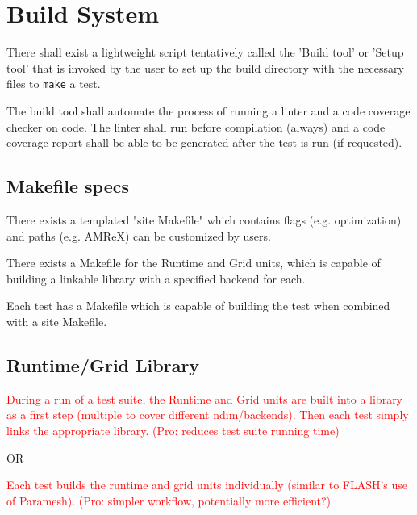 \documentclass{article}
\begin{document}
\section{Build System}
\begin{req}
There shall exist a lightweight script tentatively called the 'Build tool' or 'Setup tool' that is invoked by the user to set up the build directory with the necessary files to \texttt{make} a test.
\end{req}
\begin{req}
The build tool shall automate the process of running a linter and a code coverage checker on code. The linter shall run before compilation (always) and a code coverage report shall be able to be generated after the test is run (if requested).
\end{req}

\subsection{Makefile specs}
\begin{spec}
There exists a templated "site Makefile" which contains flags (e.g. optimization) and paths (e.g. AMReX) can be customized by users.
\end{spec}
\begin{spec}
There exists a Makefile for the Runtime and Grid units, which is capable of building a linkable library with a specified backend for each.
\end{spec}
\begin{spec}
Each test has a Makefile which is capable of building the test when combined with a site Makefile.
\end{spec}


\subsection{Runtime/Grid Library}
\begin{spec}
\textcolor{red}{
During a run of a test suite, the Runtime and Grid units are built into a library as a first step (multiple to cover different ndim/backends). Then each test simply links the appropriate library. (Pro: reduces test suite running time)}

OR

\textcolor{red}{Each test builds the runtime and grid units individually (similar to FLASH's use of Paramesh). (Pro: simpler workflow, potentially more efficient?)}
\end{spec}
\end{document}
